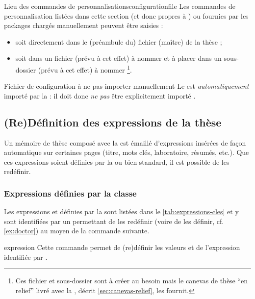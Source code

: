 \begin{dbremark}{Lieu des commandes de personnalisations}{configurationfile}
  Les commandes de personnalisation listées dans cette section (et donc propres
  à \yatcl{}) ou fournies par les packages chargés manuellement peuvent être
  saisies :
  \begin{itemize}
  \item soit directement dans le (préambule du) fichier (maître) de la thèse ;
  \item soit dans un fichier (prévu à cet effet) à nommer
    \file{\configurationfile} et à placer dans un sous-dossier (prévu à cet
    effet) à nommer \directory{\configurationdirectory}\footnote{Ces fichier et
      sous-dossier sont à créer au besoin mais le canevas de thèse \enquote{en
        relief} livré avec la \yatcl, décrit \vref{sec:canevas-relief}, les
      fournit.}.
  \end{itemize}
\end{dbremark}

\begin{dbwarning}{Fichier de configuration à ne pas importer manuellement}{}
  Le \File{\configurationfile} est \emph{automatiquement} importé par la
  \yatcl{} : il doit donc \emph{ne pas} être explicitement importé .
\end{dbwarning}

\subsection{(Re)Définition des expressions de la
  thèse}\label{sec:expressions-cles}

Un mémoire de thèse composé avec la \yatcl est émaillé d'expressions insérées
de façon automatique sur certaines pages (titre, mots clés, laboratoire,
résumés, etc.). Que ces expressions soient définies par la \yatcl ou bien
standard, il est possible de les redéfinir.

\subsubsection{Expressions définies par la classe}
\label{sec:expr-defin-par}

Les expressions  et  définies par la \yatcl
sont listées dans le \vref{tab:expressions-cles} et y sont identifiées par un
 permettant de les redéfinir (voire de les définir, cf.
\vref{ex:doctor}) au moyen de la commande  suivante.
%
\begin{docCommand}{expression}{}
  Cette commande permet de (re)définir les valeurs  et
   de l'expression identifiée par .
\end{docCommand}

